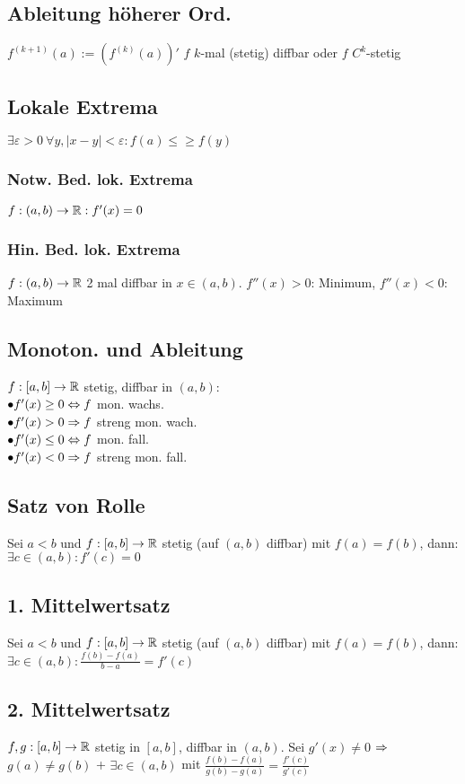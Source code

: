 \subsection*{Ableitung höherer Ord.}
$f^{(k + 1)}(a) := \left(f^{(k)}(a)\right)'$
$f$ $k$-mal (stetig) diffbar oder $f$ $C^k$-stetig
\subsection*{Lokale Extrema}
$\exists\varepsilon > 0 \ \forall y, |x - y| < \varepsilon: f(a) \leq\geq f(y)$
\subsubsection*{Notw. Bed. lok. Extrema}
$f:(a, b) \rightarrow \mathbb R: f'(x) = 0$
\subsubsection*{Hin. Bed. lok. Extrema}
$f:(a, b) \rightarrow \mathbb R$ 2 mal diffbar in $x \in (a, b)$. $f''(x) > 0$: Minimum, $f''(x) < 0$: Maximum
\subsection*{Monoton. und Ableitung}
$f:[a,b]\rightarrow \mathbb R$ stetig, diffbar in $(a, b)$:\\
    $\bullet f'(x) \geq 0 \Leftrightarrow f$ mon. wachs.\\
    $\bullet f'(x) > 0 \Rightarrow f$ streng mon. wach.\\
    $\bullet f'(x) \leq 0 \Leftrightarrow f$ mon. fall.\\
    $\bullet f'(x) < 0 \Rightarrow f$ streng mon. fall.
\subsection*{Satz von Rolle}
Sei $a < b$ und $f:[a, b] \rightarrow \mathbb R$ stetig (auf $(a, b)$ diffbar) mit $f(a) = f(b)$, dann: $\exists c \in (a, b): f'(c) = 0$
\subsection*{1. Mittelwertsatz}
Sei $a < b$ und $f:[a, b] \rightarrow \mathbb R$ stetig (auf $(a, b)$ diffbar) mit $f(a) = f(b)$, dann: $\exists c \in (a, b): \frac{f(b) - f(a)}{b - a} = f'(c)$
\subsection*{2. Mittelwertsatz}
$f, g: [a, b]\rightarrow \mathbb R$ stetig in $[a, b]$, diffbar in $(a, b)$. Sei 
$g'(x)\neq 0$ $\Rightarrow$ $g(a) \neq g(b)$ + $\exists c \in (a, b)$ mit $\frac{f(b) - f(a)}{g(b) - g(a)} = \frac{f'(c)}{g'(c)}$

